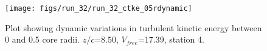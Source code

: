 \begin{figure}[H]
\centering
\texttt{[image: figs/run\_32/run\_32\_ctke\_05rdynamic]}
\caption{Plot showing dynamic variations in turbulent kinetic energy between 0 and 0.5 core radii. $z/c$=8.50, $V_{free}$=17.39, station 4.}
\label{fig:run_32_ctke_05rdynamic}
\end{figure}


